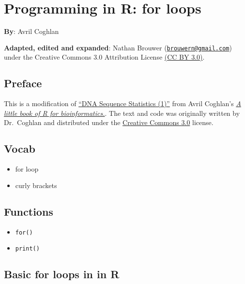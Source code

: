 \documentclass[
]{book}
\providecommand{\tightlist}{%
  \setlength{\itemsep}{0pt}\setlength{\parskip}{0pt}}
\begin{document}
\hypertarget{programming-in-r-for-loops}{%
\chapter{Programming in R: for loops}\label{programming-in-r-for-loops}}

\textbf{By}: Avril Coghlan

\textbf{Adapted, edited and expanded}: Nathan Brouwer (\href{mailto:brouwern@gmail.com}{\nolinkurl{brouwern@gmail.com}}) under the Creative Commons 3.0 Attribution License \href{https://creativecommons.org/licenses/by/3.0/}{(CC BY 3.0)}.

\hypertarget{preface-2}{%
\section{Preface}\label{preface-2}}

This is a modification of \href{https://a-little-book-of-r-for-bioinformatics.readthedocs.io/en/latest/src/chapter1.html}{``DNA Sequence Statistics (1)''} from Avril Coghlan's \href{https://a-little-book-of-r-for-bioinformatics.readthedocs.io/en/latest/index.html}{\emph{A little book of R for bioinformatics.}}. The text and code was originally written by Dr.~Coghlan and distributed under the \href{https://creativecommons.org/licenses/by/3.0/us/}{Creative Commons 3.0} license.

\hypertarget{vocab}{%
\section{Vocab}\label{vocab}}

\begin{itemize}
\tightlist
\item
  for loop
\item
  curly brackets
\end{itemize}

\hypertarget{functions-1}{%
\section{Functions}\label{functions-1}}

\begin{itemize}
\tightlist
\item
  \texttt{for()}
\item
  \texttt{print()}
\end{itemize}

\hypertarget{basic-for-loops-in-in-r}{%
\section{Basic for loops in in R}\label{basic-for-loops-in-in-r}}
\end{document}
